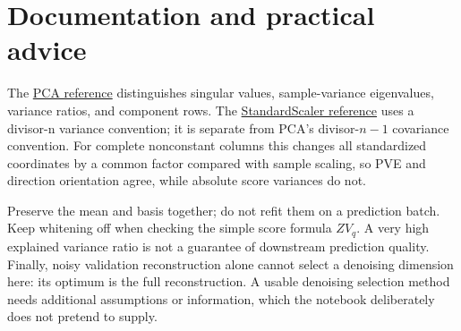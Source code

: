 \section*{Documentation and practical advice}
The \href{https://scikit-learn.org/1.8/modules/generated/sklearn.decomposition.PCA.html}{PCA reference}
distinguishes singular values, sample-variance eigenvalues, variance ratios, and component rows.
The \href{https://scikit-learn.org/1.8/modules/generated/sklearn.preprocessing.StandardScaler.html}{StandardScaler reference}
uses a divisor-n variance convention; it is separate from PCA's divisor-$n-1$ covariance convention.
For complete nonconstant columns this changes all standardized coordinates by a common factor compared with sample scaling,
so PVE and direction orientation agree, while absolute score variances do not.

Preserve the mean and basis together; do not refit them on a prediction batch.
Keep whitening off when checking the simple score formula $ZV_q$.
A very high explained variance ratio is not a guarantee of downstream prediction quality.
Finally, noisy validation reconstruction alone cannot select a denoising dimension here: its optimum is the full reconstruction.
A usable denoising selection method needs additional assumptions or information, which the notebook deliberately does not pretend to supply.

